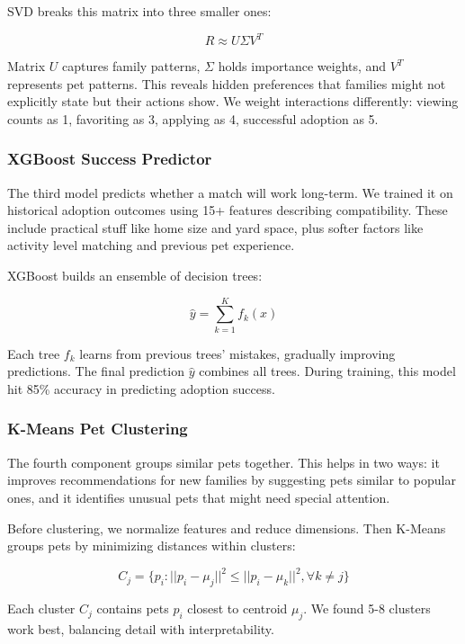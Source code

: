 \documentclass[conference]{IEEEtran}
\begin{document}
SVD breaks this matrix into three smaller ones:

\begin{equation}
R \approx U \Sigma V^T
\end{equation}

Matrix $U$ captures family patterns, $\Sigma$ holds importance weights, and $V^T$ represents pet patterns. This reveals hidden preferences that families might not explicitly state but their actions show. We weight interactions differently: viewing counts as 1, favoriting as 3, applying as 4, successful adoption as 5.

\subsubsection{XGBoost Success Predictor}
The third model predicts whether a match will work long-term. We trained it on historical adoption outcomes using 15+ features describing compatibility. These include practical stuff like home size and yard space, plus softer factors like activity level matching and previous pet experience.

XGBoost builds an ensemble of decision trees:

\begin{equation}
\hat{y} = \sum_{k=1}^{K} f_k(x)
\end{equation}

Each tree $f_k$ learns from previous trees' mistakes, gradually improving predictions. The final prediction $\hat{y}$ combines all trees. During training, this model hit 85\% accuracy in predicting adoption success.

\subsubsection{K-Means Pet Clustering}
The fourth component groups similar pets together. This helps in two ways: it improves recommendations for new families by suggesting pets similar to popular ones, and it identifies unusual pets that might need special attention.

Before clustering, we normalize features and reduce dimensions. Then K-Means groups pets by minimizing distances within clusters:

\begin{equation}
C_j = \{p_i : ||p_i - \mu_j||^2 \leq ||p_i - \mu_k||^2, \forall k \neq j\}
\end{equation}

Each cluster $C_j$ contains pets $p_i$ closest to centroid $\mu_j$. We found 5-8 clusters work best, balancing detail with interpretability.
\end{document}
